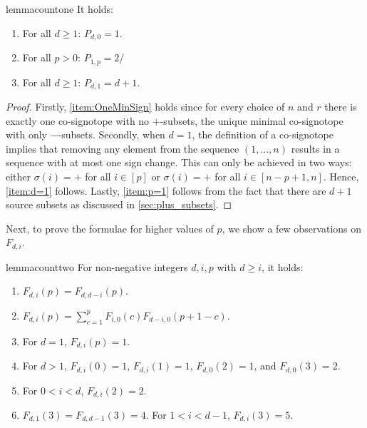 \documentclass[a4paper,11pt]{amsart}
\begin{document}
\begin{restatable}{lemma}{countone}
    It holds: 
    \begin{enumerate}[label=(\alph*)]
        \item \label{item:OneMinSign}
        For all $d \geq 1$: $P_{d,0} = 1$.
        \item \label{item:d=1}
        For all $p>0$: $P_{1,p} =2$/
        \item \label{item:p=1}
        For all $d \geq 1$: $P_{d,1} = d+1$.
    \end{enumerate}
\end{restatable}

\begin{proof}
    Firstly, \ref{item:OneMinSign} holds since for every choice of $n$ and $r$ there is exactly one co-signotope with no $+$-subsets, the unique minimal co-signotope with only $-$-subsets. 
    Secondly, when $d=1$, the definition of a co-signotope implies that removing any element from the sequence $(1, \dots, n)$ results in a sequence with at most one sign change.
    This can only be achieved in two ways: either $\sigma(i) = +$ for all $i \in [p]$ or $\sigma(i) = +$ for all $i \in [n-p+1,n]$.
    Hence, \ref{item:d=1} follows.
    Lastly, \ref{item:p=1} follows from the fact that there are $d+1$ source subsets as discussed in \cref{sec:plus_subsets}.
\end{proof}


Next, to prove the formulae for higher values of $p$, we show a few observations on $F_{d,i}$.

\begin{restatable}{lemma}{counttwo}
\label{lem:f_obs}
    For non-negative integers $d,i,p$ with $d \geq i$, it holds:
    \begin{enumerate}[label=(\alph*)]
        \item \label{item:f_sym} $F_{d,i}(p) = F_{d,d-i}(p)$.
        \item \label{item:f_decomp} 
            $F_{d,i}(p) = \sum^{p}_{c=1}F_{i,0}(c)F_{d-i,0}(p+1-c)$.
        \item For $d = 1$, $F_{d,i}(p) = 1$.
        \item \label{item:f_small}
            For $d > 1$, $F_{d,i}(0) = 1$, $F_{d,i}(1) = 1$, $F_{d,0}(2) = 1$, and $F_{d,0}(3) = 2$.
        \item
            For $0 < i < d$, $F_{d,i}(2) = 2$.
        \item 
            $F_{d,1}(3) = F_{d,d-1}(3) = 4$. For $1 < i < d-1$, $F_{d,i}(3) = 5$.
    \end{enumerate}
\end{restatable}    
\end{document}

